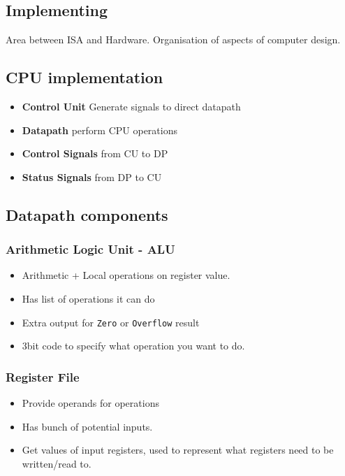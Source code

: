 \documentclass{article}
\begin{document}
	\subsection*{Implementing}
		Area between ISA and Hardware. Organisation of aspects of computer design.

	\subsection*{CPU implementation}
		\begin{itemize}
			\item \textbf{Control Unit} Generate signals to direct datapath
			\item \textbf{Datapath} perform CPU operations\\

			\item \textbf{Control Signals} from CU to DP
			\item \textbf{Status Signals} from DP to CU
		\end{itemize}

	\subsection*{Datapath components}
		\subsubsection*{Arithmetic Logic Unit - ALU}
			\begin{itemize}
				\item Arithmetic + Local operations on register value.
				\item Has list of operations it can do
				\item Extra output for \texttt{Zero} or \texttt{Overflow} result
				\item 3bit code to specify what operation you want to do.
			\end{itemize}

		\subsubsection*{Register File}
			\begin{itemize}
				\item Provide operands for operations
				\item Has bunch of potential inputs.
				\item Get values of input registers, used to represent what registers need to be written/read to.
			\end{itemize}
\end{document}
